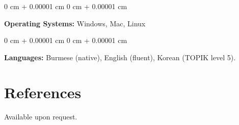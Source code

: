 \documentclass[10pt, letterpaper]{article}
\newenvironment{onecolentry}{
    \begin{adjustwidth}{
        0 cm + 0.00001 cm
    }{
        0 cm + 0.00001 cm
    }
}{
    \end{adjustwidth}
} %
\begin{document}
        \vspace{0.2 cm}

        \begin{onecolentry}
        \textbf{Operating Systems:} Windows, Mac, Linux \end{onecolentry}

        \vspace{0.2 cm}

        \begin{onecolentry}
        \textbf{Languages:} Burmese (native), English (fluent), Korean (TOPIK level 5).
        \end{onecolentry}
\section*{References}
Available upon request.
\end{document}
